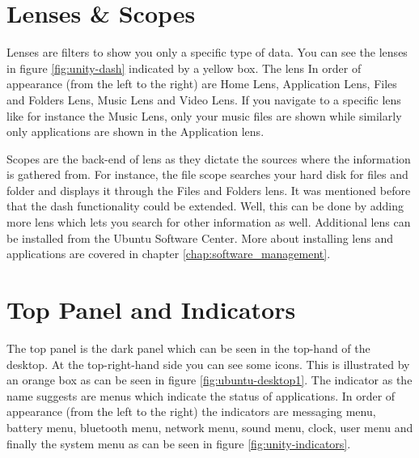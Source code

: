 \par \noindent {}


\section{Lenses \& Scopes} 
Lenses are filters to show you only a specific type of data. You can see the lenses in figure \ref{fig:unity-dash} indicated by a yellow box. The lens In order of appearance (from the left to the right) are Home Lens, Application Lens, Files and Folders Lens, Music Lens and Video Lens. If you navigate to a specific lens like for instance the Music Lens, only your music files are shown while similarly only applications are shown in the Application lens. \\

\par \noindent Scopes are the back-end of lens as they dictate the sources where the information is gathered from. For instance, the file scope searches your hard disk for files and folder and displays it through the Files and Folders lens. It was mentioned before that the dash functionality could be extended. Well, this can be done by adding more lens which lets you search for other information as well. Additional lens can be installed from the Ubuntu Software Center. More about installing lens and applications are covered in chapter \ref{chap:software_management}. \\

\par \noindent {}

\section{Top Panel and Indicators} 
The top panel is the dark panel which can be seen in the top-hand of the desktop. At the top-right-hand side you can see some icons. This is illustrated by an orange box as can be seen in figure \ref{fig:ubuntu-desktop1}. The indicator as the name suggests are menus which indicate the status of applications. In order of appearance (from the left to the right) the indicators are messaging menu, battery menu, bluetooth menu, network menu, sound menu, clock, user menu and finally the system menu as can be seen in figure \ref{fig:unity-indicators}.

